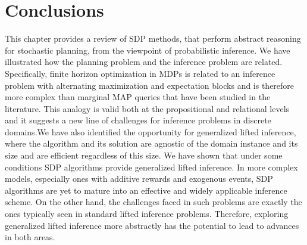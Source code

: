 %

\section{Conclusions}

%
This chapter provides a review of SDP methods, that perform abstract reasoning for stochastic planning, from the viewpoint of probabilistic inference. We have illustrated how the planning problem and the inference problem are related. Specifically, finite horizon optimization in MDPs is related to an inference problem with alternating maximization and expectation blocks and is therefore more complex than  marginal MAP queries that have been studied in the literature. This analogy is valid both at the propositional and relational levels and it suggests a new line of challenges for inference problems in discrete domains.We have also identified the opportunity for generalized lifted inference, where the algorithm and its solution are  agnostic of the domain instance and its size and are efficient regardless of this size. We have shown that under some conditions SDP algorithms provide generalized lifted inference. In more complex models, especially ones with additive rewards and exogenous events, SDP algorithms are yet to mature into an effective and widely applicable inference scheme. On the other hand, the challenges faced in such problems are exactly the ones typically seen in standard lifted inference problems. Therefore, exploring generalized lifted inference more abstractly has the potential to lead to advances in both areas.

